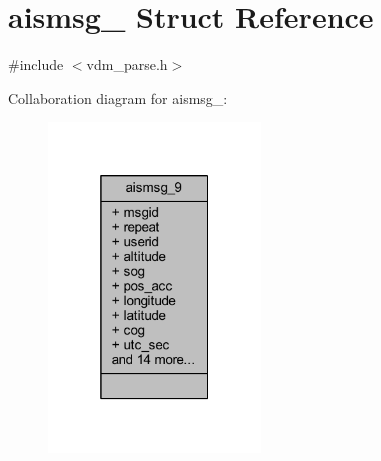 \hypertarget{structaismsg__9}{}\section{aismsg\+\_ Struct Reference}
\label{structaismsg__9}


{\ttfamily \#include $<$vdm\+\_\+parse.\+h$>$}



Collaboration diagram for aismsg\+\_\+:
\nopagebreak
\begin{figure}[H]
\begin{center}
\leavevmode
\includegraphics[width=160pt]{structaismsg__9__coll__graph}
\end{center}
\end{figure}
